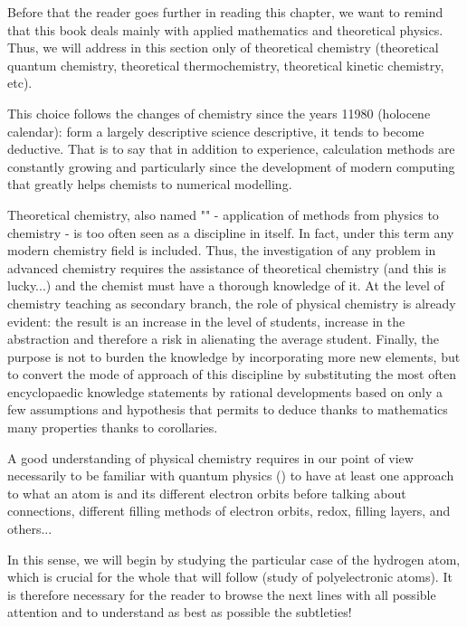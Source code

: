 	Before that the reader goes further in reading this chapter, we want to remind that this book deals mainly with applied mathematics and theoretical physics. Thus, we will address in this section only of theoretical chemistry (theoretical quantum  chemistry, theoretical thermochemistry, theoretical kinetic chemistry, etc).
	
	This choice follows the changes of chemistry since the years 11980 (holocene calendar): form a largely descriptive science descriptive, it tends to become deductive. That is to say that in addition to experience, calculation methods are constantly growing and particularly since the development of modern computing that greatly helps chemists to numerical modelling.	
	
	Theoretical chemistry, also named "" - application of methods from physics to chemistry - is too often seen as a discipline in itself. In fact, under this term any modern chemistry field is included. Thus, the investigation of any problem in advanced chemistry requires the assistance of theoretical chemistry (and this is lucky...) and the chemist must have a thorough knowledge of it. At the level of chemistry teaching as secondary branch, the role of physical chemistry is already evident: the result is an increase in the level of students, increase in the abstraction and therefore a risk in alienating the average student. Finally, the purpose is not to burden the knowledge by incorporating more new elements, but to convert the mode of approach of this discipline by substituting the most often encyclopaedic knowledge statements by rational developments based on only a few assumptions and hypothesis that permits to deduce thanks to mathematics many properties thanks to corollaries.
	
	A good understanding of physical chemistry requires in our point of view necessarily to be familiar with quantum physics () to have at least one approach to what an atom is and its different electron orbits before talking about connections, different filling methods of electron orbits, redox, filling layers, and others...
	
	In this sense, we will begin by studying the particular case of the hydrogen atom, which is crucial for the whole that will follow (study of polyelectronic atoms). It is therefore necessary for the reader to browse the next lines with all possible attention and to understand as best as possible the subtleties!
	
